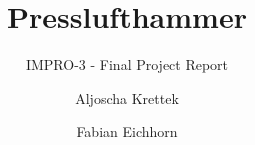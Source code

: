 \documentclass[%
   final,      %
   paper=a4,%
   paper=portrait, %
   pagesize=auto, %
   fontsize=12pt,%
   version=last, %
]{scrartcl} %
\begin{document}
\title{Presslufthammer}
\subtitle{IMPRO-3 - Final Project Report}
\author{Aljoscha Krettek \and Fabian Eichhorn}
\maketitle
\tableofcontents





\clearpage
\listoffigures
\listoftables
\renewcommand{\lstlistlistingname}{List of Listings}
\lstlistoflistings

\appendix


\end{document}
